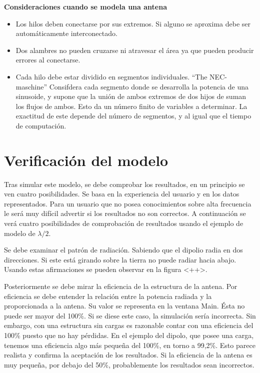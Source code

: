 \documentclass[12pt]{article}
\begin{document}
\textbf{Consideraciones cuando se modela una antena}

\begin{itemize}%
    \item Los hilos deben conectarse por sus extremos. Si alguno se aproxima
	debe ser autom\'aticamente interconectado.
    \item Dos alambres no pueden cruzarse ni atravesar el \'area ya que pueden
	producir errores al conectarse.
    \item Cada hilo debe estar dividido en segmentos individuales. ``The
	NEC-maschine'' Consifdera cada segmento donde se desarrolla la potencia
	de una sinusoide, y supone que la uni\'on de ambos extremos de dos
	hijos de suman los flujos de ambos. Esto da un n\'umero finito de
	variables a determinar. La exactitud de este depende del n\'umero de
	segmentos, y al igual que el tiempo de computaci\'on.
\end{itemize}

\section{Verificaci\'on del modelo}

Tras simular este modelo, se debe comprobar los resultados, en un principio se
ven cuatro posibilidades. Se basa en la experiencia del usuario y en los datos
representados. Para un usuario que no posea conocimientos sobre alta frecuencia
le ser\'a muy difícil advertir si los resultados no son correctos. A
continuaci\'on se ver\'a cuatro posibilidades de comprobaci\'on de resultados
usando el ejemplo de modelo de $\lambda/2$.

Se debe examinar el patr\'on de radiaci\'on. Sabiendo que el dipolio radia en
dos direcciones. Si este est\'a girando sobre la tierra no puede radiar hacia
abajo. Usando estas afirmaciones se pueden observar en la figura <++>.

Posteriormente se debe mirar la eficiencia de la estructura de la antena. Por
eficiencia se debe entender la relación entre la potencia radiada y la
proporcionada a la antena. Su valor se representa en la ventana Main. Ésta no
puede ser mayor del 100\%. Si se diese este caso, la simulación sería
incorrecta. Sin embargo, con una estructura sin cargas es razonable contar con
una eficiencia del 100\% puesto que no hay pérdidas. En el ejemplo del dipolo,
que posee una carga, tenemos una eficiencia algo m\'as pequeña del 100\%, en
torno a 99,2\%. Esto parece realista y confirma la aceptación de los
resultados. Si la eficiencia de la antena es muy pequeña, por debajo del 50\%,
probablemente los resultados sean incorrectos.
\end{document}
